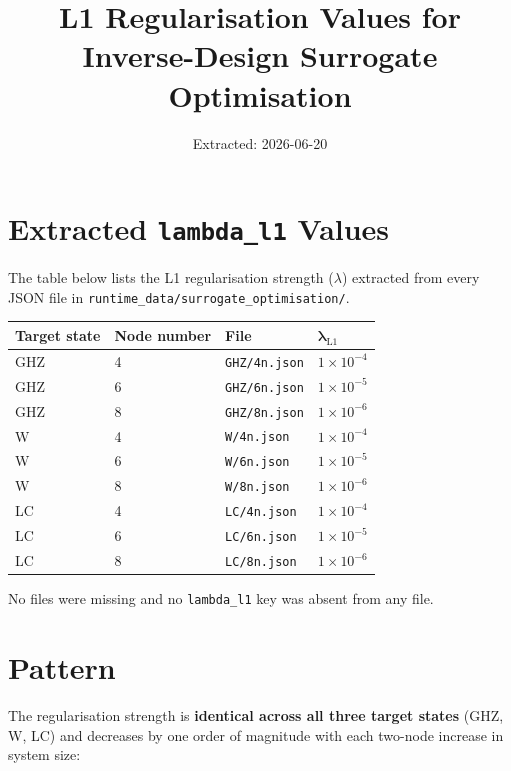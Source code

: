 \documentclass[11pt,a4paper]{article}
\title{\textbf{L1 Regularisation Values for Inverse-Design Surrogate Optimisation}}
\author{}
\date{Extracted: 2026-06-20}
\begin{document}
\maketitle
\thispagestyle{empty}

\section*{Extracted \texttt{lambda\_l1} Values}

The table below lists the L1 regularisation strength (\(\lambda\)) extracted from
every JSON file in \texttt{runtime\_data/surrogate\_optimisation/}.

\vspace{0.5em}
\begin{center}
\begin{tabular}{llll}
\toprule
\textbf{Target state} & \textbf{Node number} & \textbf{File} & \(\boldsymbol{\lambda_{\mathrm{L1}}}\) \\
\midrule
GHZ & 4 & \texttt{GHZ/4n.json} & $1\times10^{-4}$ \\
GHZ & 6 & \texttt{GHZ/6n.json} & $1\times10^{-5}$ \\
GHZ & 8 & \texttt{GHZ/8n.json} & $1\times10^{-6}$ \\
\midrule
W   & 4 & \texttt{W/4n.json}   & $1\times10^{-4}$ \\
W   & 6 & \texttt{W/6n.json}   & $1\times10^{-5}$ \\
W   & 8 & \texttt{W/8n.json}   & $1\times10^{-6}$ \\
\midrule
LC  & 4 & \texttt{LC/4n.json}  & $1\times10^{-4}$ \\
LC  & 6 & \texttt{LC/6n.json}  & $1\times10^{-5}$ \\
LC  & 8 & \texttt{LC/8n.json}  & $1\times10^{-6}$ \\
\bottomrule
\end{tabular}
\end{center}

\vspace{0.5em}
No files were missing and no \texttt{lambda\_l1} key was absent from any file.

\section*{Pattern}

The regularisation strength is \textbf{identical across all three target states}
(GHZ, W, LC) and decreases by one order of magnitude with each two-node increase
in system size:
\end{document}
